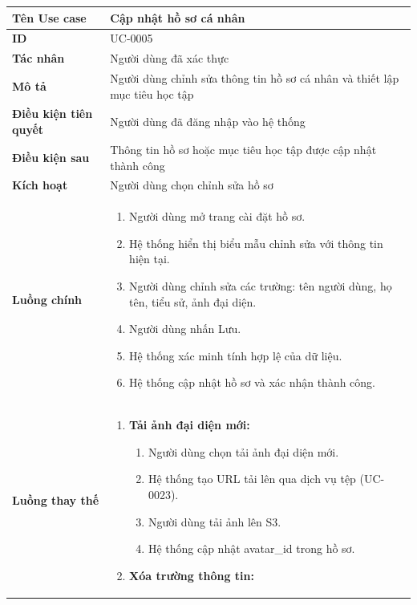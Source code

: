 {
\renewcommand{\arraystretch}{1.5}

\begin{tabularx}{\textwidth}{|>{\raggedright\arraybackslash}X|>{\raggedright\arraybackslash}X|}
\hline
\textbf{Tên Use case} & Cập nhật hồ sơ cá nhân \\
\hline
\textbf{ID} & UC-0005 \\
\hline
\textbf{Tác nhân} & Người dùng đã xác thực \\
\hline
\textbf{Mô tả} & Người dùng chỉnh sửa thông tin hồ sơ cá nhân và thiết lập mục tiêu học tập \\
\hline
\textbf{Điều kiện tiên quyết} & Người dùng đã đăng nhập vào hệ thống \\
\hline
\textbf{Điều kiện sau} & Thông tin hồ sơ hoặc mục tiêu học tập được cập nhật thành công \\
\hline
\textbf{Kích hoạt} & Người dùng chọn chỉnh sửa hồ sơ \\
\hline
\textbf{Luồng chính} &
\begin{enumerate}
    \item Người dùng mở trang cài đặt hồ sơ.
    \item Hệ thống hiển thị biểu mẫu chỉnh sửa với thông tin hiện tại.
    \item Người dùng chỉnh sửa các trường: tên người dùng, họ tên, tiểu sử, ảnh đại diện.
    \item Người dùng nhấn Lưu.
    \item Hệ thống xác minh tính hợp lệ của dữ liệu.
    \item Hệ thống cập nhật hồ sơ và xác nhận thành công.
\end{enumerate} \\
\hline
\textbf{Luồng thay thế} &
\begin{enumerate}
    \item \textbf{Tải ảnh đại diện mới:}
    \begin{enumerate}
        \item[3A.] Người dùng chọn tải ảnh đại diện mới.
        \item[4A.] Hệ thống tạo URL tải lên qua dịch vụ tệp (UC-0023).
        \item[5A.] Người dùng tải ảnh lên S3.
        \item[6A.] Hệ thống cập nhật avatar\_id trong hồ sơ.
    \end{enumerate}
    \item \textbf{Xóa trường thông tin:}
    \begin{enumerate}

\end{enumerate}
\end{enumerate}
\end{tabularx}}
